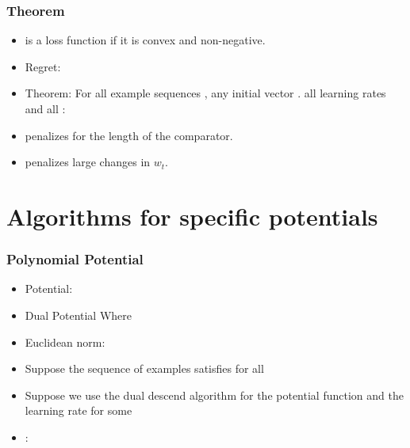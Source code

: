 \documentclass[handout]{beamer}
\begin{document}
\begin{frame}
  \frametitle{Theorem}
  \begin{itemize}
  \item \R{$\ell:\real \times \real \to \real$} is a 
    loss function if it is convex and  non-negative.
  \item Regret: 
  \item Theorem: For all example sequences
    , any initial vector
    . all learning rates  and all :
  \item {} penalizes for the length of the comparator.
    \item {} penalizes large changes in $w_t$.
  \end{itemize}
\end{frame}

\section{Algorithms for specific potentials}

\begin{frame}
  \frametitle{Polynomial Potential}
  \begin{itemize}
  \item Potential: 
  \item Dual Potential  Where
  \item Euclidean norm: 
  \item Suppose the sequence of examples
     satisfies  for all 
  \item Suppose we use the dual descend algorithm for the potential
    function  and the learning rate  for some 
  \item {}:\\
  \end{itemize}
\end{frame}
\end{document}
